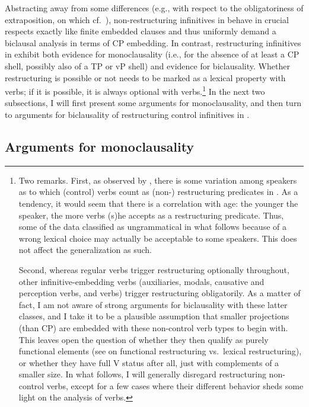 \documentclass[output=paper]{langsci/langscibook}
\begin{document}
Abstracting away from some differences (e.g., with respect to the
obligatoriness of extraposition, on which cf.\ \citealt{BibHolRob2014}),
non-restructuring  infinitives in  behave in crucial respects
exactly like finite embedded clauses and thus uniformly demand a biclausal
analysis in terms of CP embedding.  In contrast, restructuring 
infinitives in  exhibit both evidence for monoclausality (i.e., for the
absence of at least a CP shell, possibly also of a TP or vP shell) and evidence
for biclausality. Whether restructuring is possible or not needs to be marked
as a lexical property with  verbs; if it is possible, it is always
optional with  verbs.\footnote{Two remarks. First, as observed by
    \citet{Fanselow:89:coh,Fanselow:91}, there is some variation among speakers
    as to which (control) verbs count as \mbox{(non-)} restructuring predicates
    in . As a tendency, it would seem that there is a correlation with
    age: the younger the speaker, the more verbs (s)he accepts as a
    restructuring predicate. Thus, some of the data classified as ungrammatical
    in what follows because of a wrong lexical choice may actually be
    acceptable to some speakers. This does not affect the generalization as
    such.

Second, whereas regular  verbs trigger restructuring optionally
throughout, other infinitive-embedding verbs (auxiliaries, modals, causative
and perception verbs, and  verbs) trigger restructuring obligatorily. As
a matter of fact, I am not aware of strong arguments for biclausality with
these latter classes, and I take it to be a plausible assumption that smaller
projections (than CP) are embedded with these non-control verb types to begin
with. This leaves open the question of whether they then qualify as purely
functional elements (see \citealt{Wurmbrand:01,Wurmbrand:04} on functional
restructuring vs.\ lexical restructuring), or whether they have full V status
after all, just with complements of a smaller size. In what follows, I will
generally disregard restructuring non-control verbs, except for a few cases
where their different behavior sheds some light on the analysis of 
verbs.} In the next two subsections, I will first present some arguments for
monoclausality, and then turn to arguments for biclausality of restructuring
control infinitives in .

\subsection{Arguments for monoclausality}\label{sec:32.2.1}
\end{document}
